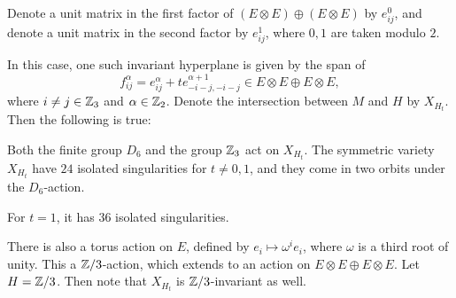 Denote a unit matrix in the first factor of $(E \otimes E) \oplus (E \otimes E)$ by $e_{ij}^0$, and denote a unit matrix in the second factor by $e_{ij}^1$, where $0,1$ are taken modulo $2$. 

In this case, one such invariant hyperplane is given by the span of
$$
f_{ij}^\alpha = e_{ij}^\alpha + t e_{-i-j,-i-j}^{\alpha+1} \in E\otimes E \oplus E \otimes E,
$$
where $i \neq j \in \mathbb{Z}_3$ and $\alpha \in \mathbb{Z}_2$. Denote the intersection between $M$ and $H$ by $X_{H_t}$. Then the following is true:

\begin{proposition}
Both the finite group $D_6$ and the group $\mathbb{Z}_3$ act on $X_{H_t}$. The symmetric variety $X_{H_t}$ have $24$ isolated singularities for $t \neq 0,1$, and they come in two orbits under the $D_6$-action.

For $t=1$, it has $36$ isolated singularities.
\end{proposition}

There is also a torus action on $E$, defined by $e_i \mapsto \omega^i e_i$, where $\omega$ is a third root of unity. This a $\mathbb{Z}/3$-action, which extends to an action on $ E\otimes E \oplus E \otimes E$. Let $H=\mathbb{Z}/3$. Then note that $X_{H_t}$ is $\mathbb{Z}/3$-invariant as well. 

